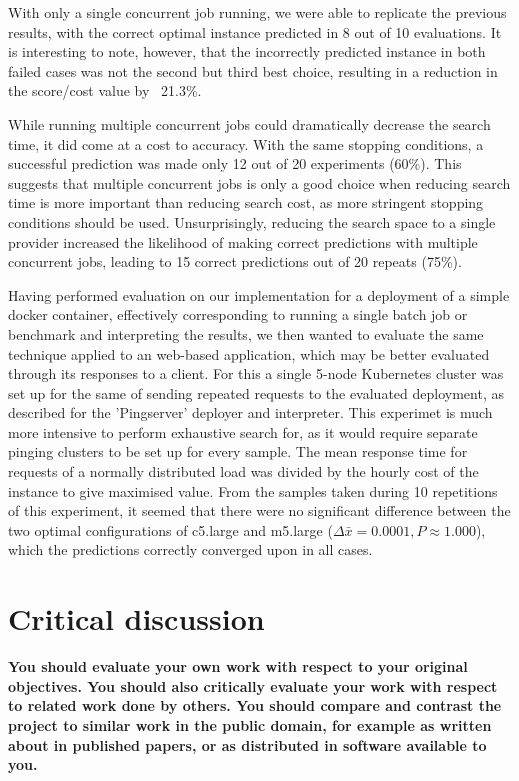 \documentclass{article}
\begin{document}
With only a single concurrent job running, we were able to replicate the previous results, with the correct optimal instance predicted in 8 out of 10 evaluations. It is interesting to note, however, that the incorrectly predicted instance in both failed cases was not the second but third best choice, resulting in a reduction in the score/cost value by ~21.3\%.

While running multiple concurrent jobs could dramatically decrease the search time, it did come at a cost to accuracy. With the same stopping conditions, a successful prediction was made only 12 out of 20 experiments (60\%). This suggests that multiple concurrent jobs is only a good choice when reducing search time is more important than reducing search cost, as more stringent stopping conditions should be used.  Unsurprisingly, reducing the search space to a single provider increased the likelihood of making correct predictions with multiple concurrent jobs, leading to 15 correct predictions out of 20 repeats (75\%).

Having performed evaluation on our implementation for a deployment of a simple docker container, effectively corresponding to running a single batch job or benchmark and interpreting the results, we then wanted to evaluate the same technique applied to an web-based application, which may be better evaluated through its responses to a client. For this a single 5-node Kubernetes cluster was set up for the same of sending repeated requests to the evaluated deployment, as described for the 'Pingserver' deployer and interpreter. This experimet is much more intensive to perform exhaustive search for, as it would require separate pinging clusters to be set up for every sample. The mean response time for requests of a normally distributed load was divided by the hourly cost of the instance to give maximised value. From the samples taken during 10 repetitions of this experiment, it seemed that there were no significant difference between the two optimal configurations of c5.large and m5.large ($\Delta \bar{x}=0.0001, P \approx 1.000$), which the predictions correctly converged upon in all cases.

\section{Critical discussion}
\textbf{You should evaluate your own work with respect to your
original objectives. You should also critically evaluate
your work with respect to related work done by others.
You should compare and contrast the project to similar
work in the public domain, for example as written about
in published papers, or as distributed in software available to you. }
\end{document}
